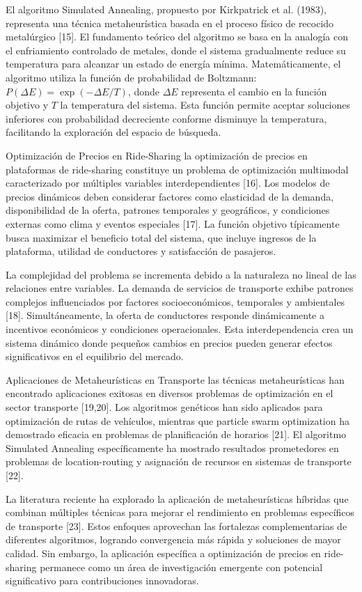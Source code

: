 \documentclass[12pt,a4paper,twocolumn]{article}
\begin{document}
El algoritmo Simulated Annealing, propuesto por Kirkpatrick et al. (1983), representa una técnica metaheurística basada en el proceso físico de recocido metalúrgico [15]. El fundamento teórico del algoritmo se basa en la analogía con el enfriamiento controlado de metales, donde el sistema gradualmente reduce su temperatura para alcanzar un estado de energía mínima. Matemáticamente, el algoritmo utiliza la función de probabilidad de Boltzmann: $P(\Delta E) = \exp(-\Delta E/T)$, donde $\Delta E$ representa el cambio en la función objetivo y $T$ la temperatura del sistema. Esta función permite aceptar soluciones inferiores con probabilidad decreciente conforme disminuye la temperatura, facilitando la exploración del espacio de búsqueda.

Optimización de Precios en Ride-Sharing la optimización de precios en plataformas de ride-sharing constituye un problema de optimización multimodal caracterizado por múltiples variables interdependientes [16]. Los modelos de precios dinámicos deben considerar factores como elasticidad de la demanda, disponibilidad de la oferta, patrones temporales y geográficos, y condiciones externas como clima y eventos especiales [17]. La función objetivo típicamente busca maximizar el beneficio total del sistema, que incluye ingresos de la plataforma, utilidad de conductores y satisfacción de pasajeros.

La complejidad del problema se incrementa debido a la naturaleza no lineal de las relaciones entre variables. La demanda de servicios de transporte exhibe patrones complejos influenciados por factores socioeconómicos, temporales y ambientales [18]. Simultáneamente, la oferta de conductores responde dinámicamente a incentivos económicos y condiciones operacionales. Esta interdependencia crea un sistema dinámico donde pequeños cambios en precios pueden generar efectos significativos en el equilibrio del mercado.

Aplicaciones de Metaheurísticas en Transporte las técnicas metaheurísticas han encontrado aplicaciones exitosas en diversos problemas de optimización en el sector transporte [19,20]. Los algoritmos genéticos han sido aplicados para optimización de rutas de vehículos, mientras que particle swarm optimization ha demostrado eficacia en problemas de planificación de horarios [21]. El algoritmo Simulated Annealing específicamente ha mostrado resultados prometedores en problemas de location-routing y asignación de recursos en sistemas de transporte [22].

La literatura reciente ha explorado la aplicación de metaheurísticas híbridas que combinan múltiples técnicas para mejorar el rendimiento en problemas específicos de transporte [23]. Estos enfoques aprovechan las fortalezas complementarias de diferentes algoritmos, logrando convergencia más rápida y soluciones de mayor calidad. Sin embargo, la aplicación específica a optimización de precios en ride-sharing permanece como un área de investigación emergente con potencial significativo para contribuciones innovadoras.
\end{document}
